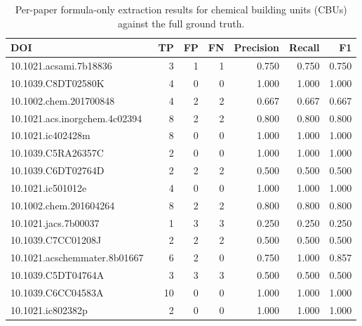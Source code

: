 \begin{table}[t]
\centering
\caption{Per-paper formula-only extraction results for chemical building units (CBUs) against the full ground truth.}
\label{tab:cbu_formula_only}
\begin{tabular}{lrrrrrr}
\hline
DOI & TP & FP & FN & Precision & Recall & F1 \\
\hline
10.1021.acsami.7b18836~\cite{lee_porous_2018}                 &  3 &  1 &  1 & 0.750 & 0.750 & 0.750 \\
10.1039.C8DT02580K~\cite{gong_functionalized_2018}            &  4 &  0 &  0 & 1.000 & 1.000 & 1.000 \\
10.1002.chem.201700848~\cite{garai_selfexfoliated_2017}       &  4 &  2 &  2 & 0.667 & 0.667 & 0.667 \\
10.1021.acs.inorgchem.4c02394~\cite{wang_steerable_2024}      &  8 &  2 &  2 & 0.800 & 0.800 & 0.800 \\
10.1021.ic402428m~\cite{liu_situ_2013}                        &  8 &  0 &  0 & 1.000 & 1.000 & 1.000 \\
10.1039.C5RA26357C~\cite{chen_synthesis_2016}                 &  2 &  0 &  0 & 1.000 & 1.000 & 1.000 \\
10.1039.C6DT02764D~\cite{zhang_synthesis_2016}                &  2 &  2 &  2 & 0.500 & 0.500 & 0.500 \\
10.1021.ic501012e~\cite{tan_two_2014}                         &  4 &  0 &  0 & 1.000 & 1.000 & 1.000 \\
10.1002.chem.201604264~\cite{liu_controlled_2016}             &  8 &  2 &  2 & 0.800 & 0.800 & 0.800 \\
10.1021.jacs.7b00037~\cite{zhang_controlled_2017}             &  1 &  3 &  3 & 0.250 & 0.250 & 0.250 \\
10.1039.C7CC01208J~\cite{zhang_self-assembly_2017}            &  2 &  2 &  2 & 0.500 & 0.500 & 0.500 \\
10.1021.acschemmater.8b01667~\cite{barreda_mechanochemical_2018} &  6 &  2 &  0 & 0.750 & 1.000 & 0.857 \\
10.1039.C5DT04764A~\cite{zhang_polyoxovanadate-based_2016}    &  3 &  3 &  3 & 0.500 & 0.500 & 0.500 \\
10.1039.C6CC04583A~\cite{zhang_anderson-like_2016}            & 10 &  0 &  0 & 1.000 & 1.000 & 1.000 \\
10.1021.ic802382p~\cite{prakash_metalorganic_2009}            &  2 &  0 &  0 & 1.000 & 1.000 & 1.000 \\

\end{tabular}
\end{table}
